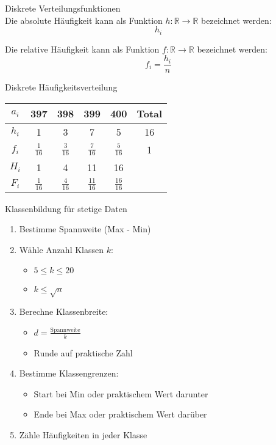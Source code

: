 \begin{definition}{Diskrete Verteilungsfunktionen}\\
Die absolute Häufigkeit kann als Funktion $h: \mathbb{R} \rightarrow \mathbb{R}$ bezeichnet werden:
$$h_i$$

Die relative Häufigkeit kann als Funktion $f: \mathbb{R} \rightarrow \mathbb{R}$ bezeichnet werden:
$$f_i = \frac{h_i}{n}$$
\end{definition}

\begin{example2}{Diskrete Häufigkeitsverteilung}\\
\renewcommand{\arraystretch}{2}%
\begin{center}
\begin{tabular}{|c|c|c|c|c|c|}
\hline
$a_i$ & 397 & 398 & 399 & 400 & Total \\
\hline
$h_i$ & 1 & 3 & 7 & 5 & 16 \\
\hline
$f_i$ & $\frac{1}{16}$ & $\frac{3}{16}$ & $\frac{7}{16}$ & $\frac{5}{16}$ & 1 \\
\hline
$H_i$ & 1 & 4 & 11 & 16 & \\
\hline
$F_i$ & $\frac{1}{16}$ & $\frac{4}{16}$ & $\frac{11}{16}$ & $\frac{16}{16}$ & \\
\hline
\end{tabular}
\end{center}
\end{example2}

\begin{KR}{Klassenbildung für stetige Daten}
\begin{enumerate}
    \item Bestimme Spannweite (Max - Min)
    \item Wähle Anzahl Klassen $k$:
        \begin{itemize}
            \item $5 \leq k \leq 20$
            \item $k \leq \sqrt{n}$
        \end{itemize}
    \item Berechne Klassenbreite:
        \begin{itemize}
            \item $d = \frac{\text{Spannweite}}{k}$
            \item Runde auf praktische Zahl
        \end{itemize}
    \item Bestimme Klassengrenzen:
        \begin{itemize}
            \item Start bei Min oder praktischem Wert darunter
            \item Ende bei Max oder praktischem Wert darüber
        \end{itemize}
    \item Zähle Häufigkeiten in jeder Klasse
\end{enumerate}
\end{KR}

